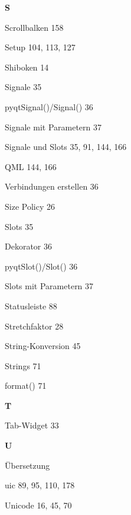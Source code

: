 \documentclass{book}
\renewcommand\indexspace{\vspace{11pt}}
\renewcommand\subitem{\par}
\begin{document}
\begin{multicols}{2}
\begin{osp-index}
  \indexspace
{\sffamily\bfseries S}\nopagebreak

  \item Scrollbalken\hspace{1mm} 158
  \item Setup\hspace{1mm} 104, 113, 127
  \item Shiboken\hspace{1mm} 14
  \item Signale\hspace{1mm} 35
    \subitem pyqtSignal()/Signal()\hspace{1mm} 36
    \subitem Signale mit Parametern\hspace{1mm} 37
  \item Signale und Slots\hspace{1mm} 35, 91, 144, 166
    \subitem QML\hspace{1mm} 144, 166
    \subitem Verbindungen erstellen\hspace{1mm} 36
  \item Size Policy\hspace{1mm} 26
  \item Slots\hspace{1mm} 35
    \subitem Dekorator\hspace{1mm} 36
    \subitem pyqtSlot()/Slot()\hspace{1mm} 36
    \subitem Slots mit Parametern\hspace{1mm} 37
  \item Statusleiste\hspace{1mm} 88
  \item Stretchfaktor\hspace{1mm} 28
  \item String-Konversion\hspace{1mm} 45
  \item Strings\hspace{1mm} 71
    \subitem format()\hspace{1mm} 71

  \indexspace
{\sffamily\bfseries T}\nopagebreak

  \item Tab-Widget\hspace{1mm} 33

  \indexspace
{\sffamily\bfseries U}\nopagebreak

  \item \"Ubersetzung\hspace{1mm} 
  \item uic\hspace{1mm} 89, 95, 110, 178
  \item Unicode\hspace{1mm} 16, 45, 70


\end{osp-index}
\end{multicols}
\end{document}

